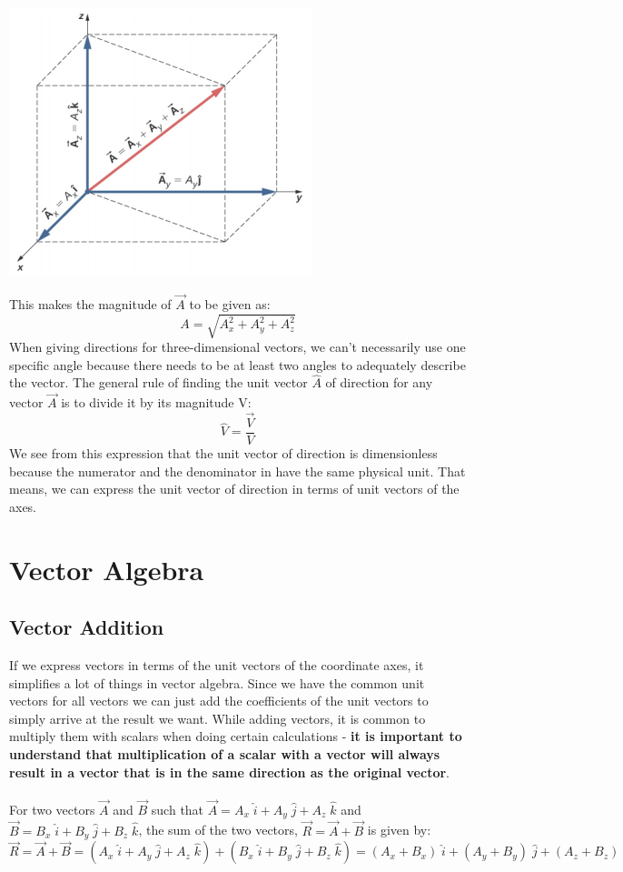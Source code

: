 \documentclass[9pt]{exam}
\begin{document}
\begin{center}
	\includegraphics[scale=0.6]{resultant_3d}
\end{center}	
This makes the magnitude of $\vec{A}$ to be given as:
$$A = \sqrt{A_{x}^{2} + A_{y}^{2} + A_{z}^{2}}$$
When giving directions for three-dimensional vectors, we can't necessarily use one specific angle because there needs to be at least two angles to adequately describe the vector. The general rule of finding the unit vector  $\hat{A}$ of direction for any vector $\vec{A}$ is to divide it by its magnitude V:
$$\hat{V} = \frac{\vec{V}}{V}$$
We see from this expression that the unit vector of direction is dimensionless because the numerator and the denominator in have the same physical unit. That means, we can express the unit vector of direction in terms of unit vectors of the axes.
\section*{Vector Algebra}
\subsection*{Vector Addition}
If we express vectors in terms of the unit vectors of the coordinate axes, it simplifies a lot of things in vector algebra. Since we have the common unit vectors for all vectors we can just add the coefficients of the unit vectors to simply arrive at the result we want. While adding vectors, it is common to multiply them with scalars when doing certain calculations - \textbf{it is important to understand that multiplication of a scalar with a vector will always result in a vector that is in the same direction as the original vector}. \\ \\
For two vectors $\vec{A}$ and $\vec{B}$ such that $\vec{A}=A_{x}\; \hat{i} + A_{y}\; \hat{j} + A_{z}\; \hat{k}$ and $\vec{B}=B_{x}\; \hat{i} + B_{y}\; \hat{j} + B_{z}\; \hat{k}$, the sum of the two vectors, $\vec{R}=\vec{A}+\vec{B}$ is given by:
$$\vec{R} = \vec{A} + \vec{B} = (A_{x}\; \hat{i} + A_{y}\; \hat{j} + A_{z}\; \hat{k}) + (B_{x}\; \hat{i} + B_{y}\; \hat{j} + B_{z}\; \hat{k}) = (A_{x} + B_{x})\; \hat{i} + (A_{y} + B_{y})\; \hat{j} + (A_{z} + B_{z})\;$$
\end{document}
